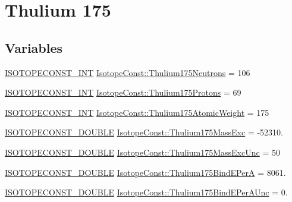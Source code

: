 \hypertarget{group___isotope_const-_thulium-_tm175}{}\section{Thulium 175}
\label{group___isotope_const-_thulium-_tm175}
\subsection*{Variables}
\begin{DoxyCompactItemize}
\item 
\mbox{\hyperlink{group___isotope_const-_macros_ga5f18360b3e99483a35c32d789e62621c}{I\+S\+O\+T\+O\+P\+E\+C\+O\+N\+S\+T\+\_\+\+I\+NT}} \mbox{\hyperlink{group___isotope_const-_thulium-_tm175_gaf488016eaa5fd7d141d4605b6cfa3c64}{Isotope\+Const\+::\+Thulium175\+Neutrons}} = 106
\item 
\mbox{\hyperlink{group___isotope_const-_macros_ga5f18360b3e99483a35c32d789e62621c}{I\+S\+O\+T\+O\+P\+E\+C\+O\+N\+S\+T\+\_\+\+I\+NT}} \mbox{\hyperlink{group___isotope_const-_thulium-_tm175_ga69bc84b584c027cf94a0f805601e3f6a}{Isotope\+Const\+::\+Thulium175\+Protons}} = 69
\item 
\mbox{\hyperlink{group___isotope_const-_macros_ga5f18360b3e99483a35c32d789e62621c}{I\+S\+O\+T\+O\+P\+E\+C\+O\+N\+S\+T\+\_\+\+I\+NT}} \mbox{\hyperlink{group___isotope_const-_thulium-_tm175_gae8410dbb9d673dce553d4d354ca58c47}{Isotope\+Const\+::\+Thulium175\+Atomic\+Weight}} = 175
\item 
\mbox{\hyperlink{group___isotope_const-_macros_ga8f45a7272ce02c0b4c65c44636ed719a}{I\+S\+O\+T\+O\+P\+E\+C\+O\+N\+S\+T\+\_\+\+D\+O\+U\+B\+LE}} \mbox{\hyperlink{group___isotope_const-_thulium-_tm175_ga09a14b1d9cf548f8ba5376cf473fa841}{Isotope\+Const\+::\+Thulium175\+Mass\+Exc}} = -\/52310.
\item 
\mbox{\hyperlink{group___isotope_const-_macros_ga8f45a7272ce02c0b4c65c44636ed719a}{I\+S\+O\+T\+O\+P\+E\+C\+O\+N\+S\+T\+\_\+\+D\+O\+U\+B\+LE}} \mbox{\hyperlink{group___isotope_const-_thulium-_tm175_ga45953453658514aee8eabca8441cbd9f}{Isotope\+Const\+::\+Thulium175\+Mass\+Exc\+Unc}} = 50
\item 
\mbox{\hyperlink{group___isotope_const-_macros_ga8f45a7272ce02c0b4c65c44636ed719a}{I\+S\+O\+T\+O\+P\+E\+C\+O\+N\+S\+T\+\_\+\+D\+O\+U\+B\+LE}} \mbox{\hyperlink{group___isotope_const-_thulium-_tm175_ga459fab1727cc4e453184a6e019477c71}{Isotope\+Const\+::\+Thulium175\+Bind\+E\+PerA}} = 8061.
\item 
\mbox{\hyperlink{group___isotope_const-_macros_ga8f45a7272ce02c0b4c65c44636ed719a}{I\+S\+O\+T\+O\+P\+E\+C\+O\+N\+S\+T\+\_\+\+D\+O\+U\+B\+LE}} \mbox{\hyperlink{group___isotope_const-_thulium-_tm175_gaa5c6029776e91f1906718312db267d65}{Isotope\+Const\+::\+Thulium175\+Bind\+E\+Per\+A\+Unc}} = 0.

\end{DoxyCompactItemize}
